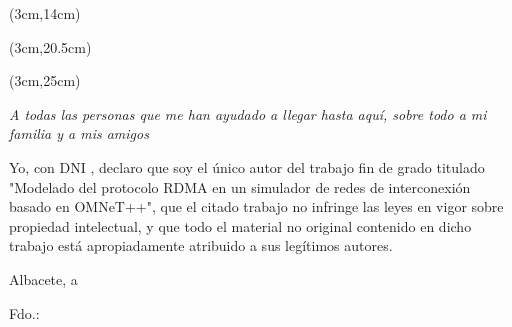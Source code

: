 \begin{textblock*}{\textwidth}(3cm,14cm) 
\begin{center}\doublespacing 
{\fontsize{22pt}{4pt}\selectfont \bft{\titulo}}
\end{center}
\end{textblock*}


\begin{textblock*}{\textwidth}(3cm,20.5cm) 
\begin{flushleft}\doublespacing
{\fontsize{14pt}{4pt}\selectfont {} \autor}

{\fontsize{14pt}{4pt}\selectfont {} \director}

{\fontsize{14pt}{4pt}\selectfont {} \codirector}
\end{flushleft}
\end{textblock*}


\begin{textblock*}{\linewidth}(3cm,25cm) 
\begin{flushright}
{\fontsize{14pt}{4pt}\selectfont \fecha}
\end{flushright}
\end{textblock*}


\cleardoublepage
\thispagestyle{empty}

\vspace*{9cm}  
\begin{flushright} \em 
A todas las personas que me han ayudado a llegar hasta aquí, sobre todo a mi familia y a mis amigos
\end{flushright}


\cleardoublepage
\thispagestyle{plain}
\begin{center}
\Large{}
\end{center}
\vskip1cm

Yo, \autor con DNI \dni, declaro que soy el único autor del trabajo fin de grado titulado "Modelado del protocolo RDMA en un simulador de redes de interconexión basado en OMNeT++", que el citado trabajo no infringe las leyes en vigor sobre propiedad intelectual, y que todo el material no original contenido en dicho trabajo está apropiadamente atribuido a sus legítimos autores.

\vspace*{2cm}
\begin{center}
Albacete, a \fecha

\vskip3cm

Fdo.: \autor
\end{center}


